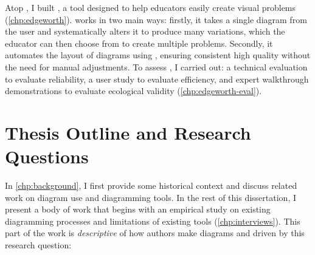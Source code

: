 Atop \Penrose, I built \Edgeworth, a tool designed to help educators easily create visual problems (\cref{chp:edgeworth}). \Edgeworth works in two main ways: firstly, it takes a single diagram from the user and systematically alters it to produce many variations, which the educator can then choose from to create multiple problems. Secondly, it automates the layout of diagrams using \Penrose, ensuring consistent high quality without the need for manual adjustments. To assess \Edgeworth, I carried out: a technical evaluation to evaluate reliability, a user study to evaluate efficiency, and expert walkthrough demonstrations to evaluate ecological validity (\cref{chp:edgeworth-eval}). 






\section{Thesis Outline and Research Questions}

In \cref{chp:background}, I first provide some historical context and discuss related work on diagram use and diagramming tools. In the rest of this dissertation, I present a body of work that begins with an empirical study on existing diagramming processes and limitations of existing tools (\cref{chp:interviews}). This part of the work is \textit{descriptive} of how authors make diagrams and driven by this research question:

